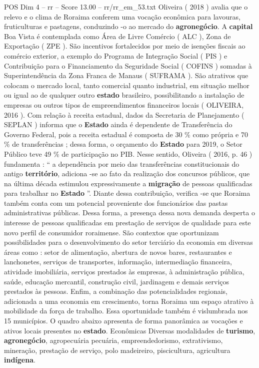 \begin{textsample}{POS Dim 4 – rr – Score 13.00 – rr/rr\_em\_53.txt}
Oliveira ( 2018 ) avalia que o relevo e o clima de Roraima conferem uma vocação econômica para lavouras, fruticulturas e pastagens, conduzindo -o ao mercado do \textbf{agronegócio}.
A \textbf{capital} Boa Vista é contemplada como Área de Livre Comércio ( ALC ), Zona de Exportação ( ZPE ).
São incentivos fortalecidos por meio de isenções fiscais ao comércio exterior, a exemplo do Programa de Integração Social ( PIS ) e Contribuição para o Financiamento da Seguridade Social ( COFINS ) somadas à Superintendência da Zona Franca de Manaus ( SUFRAMA ).
São atrativos que colocam o mercado local, tanto comercial quanto industrial, em situação melhor ou igual ao de qualquer outro \textbf{estado} brasileiro, possibilitando a instalação de empresas ou outros tipos de empreendimentos financeiros locais ( OLIVEIRA, 2016 ).
Com relação à receita estadual, dados da Secretaria de Planejamento ( SEPLAN ) informa que o \textbf{Estado} ainda é dependente de Transferência do Governo Federal, pois a receita estadual é composta de 30 \% como própria e 70 \% de transferências ; dessa forma, o orçamento do \textbf{Estado} para 2019, o Setor Público teve 49 \% de participação no PIB.
Nesse sentido, Oliveira ( 2016, p. 46 ) fundamenta : “ a dependência por meio das transferências constitucionais do antigo \textbf{território}, adiciona -se ao fato da realização dos concursos públicos, que na última década estimulou expressivamente a \textbf{migração} de pessoas qualificadas para trabalhar no \textbf{Estado} ”.
Diante dessa contribuição, verifica -se que Roraima também conta com um potencial proveniente dos funcionários das pastas administrativas públicas.
Dessa forma, a presença dessa nova demanda desperta o interesse de pessoas qualificadas em prestação de serviços de qualidade para este novo perfil de consumidor roraimense.
São contextos que oportunizam possibilidades para o desenvolvimento do setor terciário da economia em diversas áreas como : setor de alimentação, abertura de novos bares, restaurantes e lanchonetes, serviços de transportes, informação, intermediação financeira, atividade imobiliária, serviços prestados às empresas, à administração pública, saúde, educação mercantil, construção civil, jardinagem e demais serviços prestados às pessoas.
Enfim, a combinação das potencialidades regionais, adicionada a uma economia em crescimento, torna Roraima um espaço atrativo à mobilidade da força de trabalho.
Essa oportunidade também é vislumbrada nos 15 municípios.
O quadro abaixo apresenta de forma panorâmica as vocações e ativos locais presentes no \textbf{estado}.
Econômicas Diversas modalidades de \textbf{turismo}, \textbf{agronegócio}, agropecuária pecuária, empreendedorismo, extrativismo, mineração, prestação de serviço, polo madeireiro, piscicultura, agricultura \textbf{indígena}.

\end{textsample}
